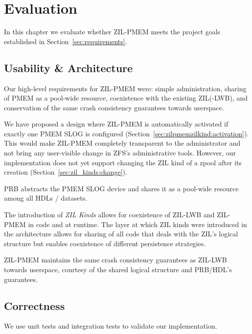 \documentclass[12pt,a4paper,twoside]{book}
\begin{document}
\chapter{Evaluation}\label{ch:eval}
In this chapter we evaluate whether ZIL-PMEM meets the project goals established in Section~\ref{sec:requirements}.

\section{Usability \& Architecture}

Our high-level requirements for ZIL-PMEM were: simple administration, sharing of PMEM as a pool-wide resource, coexistence with the existing ZIL(-LWB), and conservation of the same crash consistency guarantees towards userspace.
\begin{description}[noitemsep]
    \item[Simple Administration] We have proposed a design where ZIL-PMEM is automatically activated if exactly one PMEM SLOG is configured (Section~\ref{sec:zilpmemzilkind:activation}).
        This would make ZIL-PMEM completely transparent to the administrator and not bring any user-visible change in ZFS's administrative tools.
        However, our implementation does not yet support changing the ZIL kind of a zpool after its creation (Section~\ref{sec:zil_kinds:change}).
    \item[Pooled Storage] PRB abstracts the PMEM SLOG device and shares it as a pool-wide resource among all HDLs / datasets.
    \item[Coexistence] The introduction of \textit{ZIL Kinds} allows for coexistence of ZIL-LWB and ZIL-PMEM in code and at runtime.
        The layer at which ZIL kinds were introduced in the architecture allows for sharing of all code that deals with the ZIL's logical structure but enables coexistence of different persistence strategies.
    \item[Same Guarantees] ZIL-PMEM maintains the same crash consistency guarantees as ZIL-LWB towards userspace, courtesy of the shared logical structure and PRB/HDL's guarantees.
\end{description}

\section{Correctness}

We use unit tests and integration tests to validate our implementation.
\end{document}

